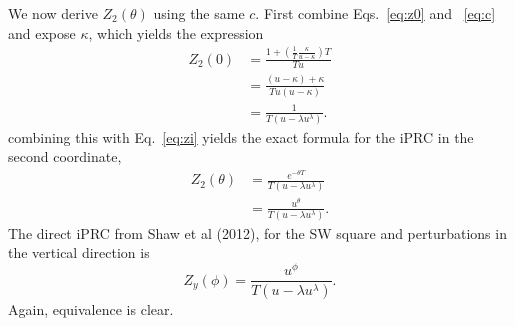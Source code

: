 \documentclass[a4paper,12pt]{article}
\begin{document}
We now derive $Z_2(\theta)$ using the same $c$.  First combine Eqs.~\eqref{eq:z0} and ~\eqref{eq:c} and expose $\kappa$, which yields the expression
\begin{equation}
\begin{split}
  Z_2(0) &= \frac{1+\left( \frac{1}{T}\frac{\kappa}{u-\kappa} \right ) T}{T u}\\
  &=\frac{(u-\kappa)+\kappa}{T u (u-\kappa)}\\
  &=\frac{1}{T (u-\lambda u^\lambda)}.
\end{split}
\end{equation}
combining this with Eq.~\eqref{eq:zi} yields the exact formula for the iPRC in the second coordinate,
\begin{equation}
\begin{split}
 Z_2(\theta) &= \frac{e^{-\theta T}}{T (u-\lambda u^\lambda)}\\
 &=\frac{u^{\theta}}{T (u-\lambda u^\lambda)}.
\end{split}
\end{equation}
The direct iPRC from Shaw et al (2012), for the SW square and perturbations in the vertical direction is
\begin{equation}
Z_y(\phi) = \frac{u^{\phi}}{T(u-\lambda u^\lambda)}.
\end{equation}
Again, equivalence is clear.
\end{document}
